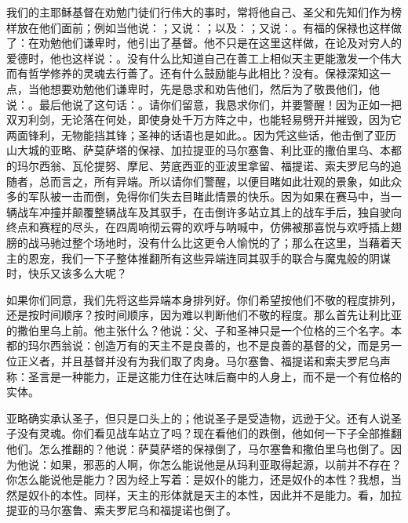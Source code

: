 我们的主耶稣基督在劝勉门徒们行伟大的事时，常将他自己、圣父和先知们作为榜样放在他们面前；例如当他说：；又说：；以及：；又说：。有福的保禄也这样做了：在劝勉他们谦卑时，他引出了基督。他不只是在这里这样做，在论及对穷人的爱德时，他也这样说：。没有什么比知道自己在善工上相似天主更能激发一个伟大而有哲学修养的灵魂去行善了。还有什么鼓励能与此相比？没有。保禄深知这一点，当他想要劝勉他们谦卑时，先是恳求和劝告他们，然后为了敬畏他们，他说：。最后他说了这句话：。请你们留意，我恳求你们，并要警醒！因为正如一把双刃利剑，无论落在何处，即使身处千万方阵之中，也能轻易劈开并摧毁，因为它两面锋利，无物能挡其锋；圣神的话语也是如此。。因为凭这些话，他击倒了亚历山大城的亚略、萨莫萨塔的保禄、加拉提亚的马尔塞鲁、利比亚的撒伯里乌、本都的玛尔西翁、瓦伦提努、摩尼、劳底西亚的亚波里拿留、福提诺、索夫罗尼乌的追随者，总而言之，所有异端。所以请你们警醒，以便目睹如此壮观的景象，如此众多的军队被一击而倒，免得你们失去目睹此情景的快乐。因为如果在赛马中，当一辆战车冲撞并颠覆整辆战车及其驭手，在击倒许多站立其上的战车手后，独自驶向终点和赛程的尽头，在四周响彻云霄的欢呼与呐喊中，仿佛被那喜悦与欢呼插上翅膀的战马驰过整个场地时，没有什么比这更令人愉悦的了；那么在这里，当藉着天主的恩宠，我们一下子整体推翻所有这些异端连同其驭手的联合与魔鬼般的阴谋时，快乐又该多么大呢？\par

如果你们同意，我们先将这些异端本身排列好。你们希望按他们不敬的程度排列，还是按时间顺序？按时间顺序，因为难以判断他们不敬的程度。那么首先让利比亚的撒伯里乌上前。他主张什么？他说：父、子和圣神只是一个位格的三个名字。本都的玛尔西翁说：创造万有的天主不是良善的，也不是良善的基督的父，而是另一位正义者，并且基督并没有为我们取了肉身。马尔塞鲁、福提诺和索夫罗尼乌声称：圣言是一种能力，正是这能力住在达味后裔中的人身上，而不是一个有位格的实体。\par

亚略确实承认圣子，但只是口头上的；他说圣子是受造物，远逊于父。还有人说圣子没有灵魂。你们看见战车站立了吗？现在看他们的跌倒，他如何一下子全部推翻他们。怎么推翻的？他说：萨莫萨塔的保禄倒了，马尔塞鲁和撒伯里乌也倒了。因为他说：如果，邪恶的人啊，你怎么能说他是从玛利亚取得起源，以前并不存在？你怎么能说他是能力？因为经上写着：是奴仆的能力，还是奴仆的本性？我想，当然是奴仆的本性。同样，天主的形体就是天主的本性，因此并不是能力。看，加拉提亚的马尔塞鲁、索夫罗尼乌和福提诺也倒了。\par

